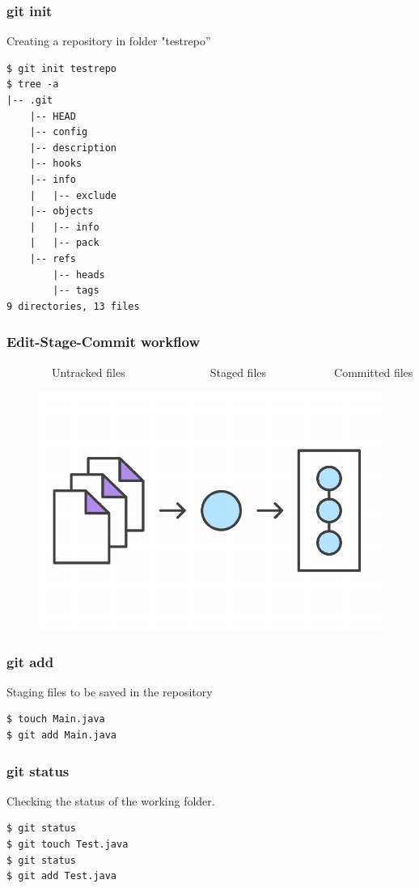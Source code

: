 \documentclass{beamer}
\begin{document}
\begin{frame}[fragile]
\frametitle{git init}
Creating a repository in folder "testrepo''
\begin{lstlisting}
$ git init testrepo
$ tree -a
|-- .git
    |-- HEAD
    |-- config
    |-- description
    |-- hooks
    |-- info
    |   |-- exclude
    |-- objects
    |   |-- info
    |   |-- pack
    |-- refs
        |-- heads
        |-- tags
9 directories, 13 files
\end{lstlisting}

\end{frame}


\begin{frame}
\frametitle{Edit-Stage-Commit workflow}
~~~~~~~~Untracked files~~~~~~~~~~~~~~~Staged files~~~~~~~~~~~~Committed files
\begin{figure}
\includegraphics[scale=0.7]{figures/04.pdf}
\end{figure}

\end{frame}

\begin{frame}[fragile]
\frametitle{git add}

Staging files to be saved in the repository

\begin{lstlisting}
$ touch Main.java
$ git add Main.java
\end{lstlisting}

\end{frame}


\begin{frame}[fragile]
\frametitle{git status}

Checking the status of the working folder.

\begin{lstlisting}
$ git status
$ git touch Test.java
$ git status
$ git add Test.java
\end{lstlisting}
\end{frame}
\end{document}
